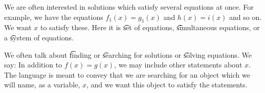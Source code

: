 We are often interested in solutions which satisfy several equations at once.
For example, we have the equations $f_1(x) = g_1(x)$ and $h(x) = i(x)$ and so on.
We want $x$ to satisfy these.
Here it is \t{set of equations}, \t{simultaneous equations}, or a \t{system of equations}.


We often talk about \t{finding} or \t{searching} for solutions or \t{solving equations}.
We say: 
In addition to $f(x) = g(x)$, we may include other statements about $x$.
The language is meant to convey that we are searching for an object which we will name, as a variable, $x$, and we want this object to satisfy the statements.
